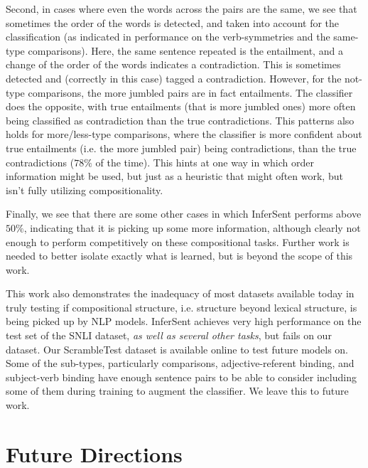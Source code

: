 \documentclass[10pt,letterpaper]{article}
\begin{document}
Second, in cases where even the words across the pairs are the same, we see that sometimes the order of the words is detected, and taken into account for the classification (as indicated in performance on the verb-symmetries and the same-type comparisons). Here, the same sentence repeated is the entailment, and a change of the order of the words indicates a contradiction. This is sometimes detected and (correctly in this case) tagged a contradiction. However, for the not-type comparisons, the more jumbled pairs are in fact entailments. The classifier does the opposite, with true entailments (that is more jumbled ones) more often being classified as contradiction than the true contradictions. This patterns also holds for more/less-type comparisons, where the classifier is more confident about true entailments (i.e. the more jumbled pair) being contradictions, than the true contradictions ($78\%$ of the time). This hints at one way in which order information might be used, but just as a heuristic that might often work, but isn't fully utilizing compositionality.

Finally, we see that there are some other cases in which InferSent performs above $50\%$, indicating that it is picking up some more information, although clearly not enough to perform competitively on these compositional tasks. Further work is needed to better isolate exactly what is learned, but is beyond the scope of this work.

This work also demonstrates the inadequacy of most datasets available today in truly testing if compositional structure, i.e. structure beyond lexical structure, is being picked up by NLP models. InferSent achieves very high performance on the test set of the SNLI dataset, \textit{as well as several other tasks}, but fails on our dataset. Our ScrambleTest dataset is available online to test future models on. Some of the sub-types, particularly comparisons, adjective-referent binding, and subject-verb binding have enough sentence pairs to be able to consider including some of them during training to augment the classifier. We leave this to future work.

\section{Future Directions}
\end{document}
